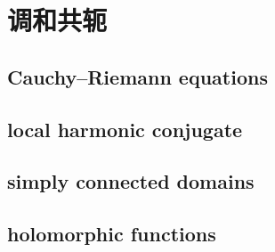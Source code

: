 \section{调和共轭}
\label{b3:sec:1502}


\subsection{Cauchy–Riemann equations}
\label{b3:subsec:150201}

\subsection{local harmonic conjugate}
\label{b3:subsec:150202}

\subsection{simply connected domains}
\label{b3:subsec:150203}

\subsection{holomorphic functions}
\label{b3:subsec:150204}


